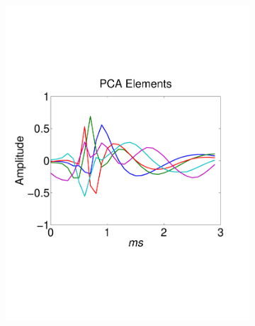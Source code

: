 \begin{center}
\begin{figure}[h!]
\begin{subfigure}[b]{.3\textwidth}
\includegraphics[width=\textwidth]{../figs/new/pcaelements.pdf}
\caption{}
\label{fig:ICold}
\end{subfigure}
\begin{subfigure}[b]{.3\textwidth}
\caption{}
\label{fig:ICold}
\end{subfigure}
\begin{subfigure}[b]{.3\textwidth}
\caption{}
\label{fig:ICold}
\end{subfigure}
\caption{ 
} \label{fig:timing}
\end{figure}
\end{center}












